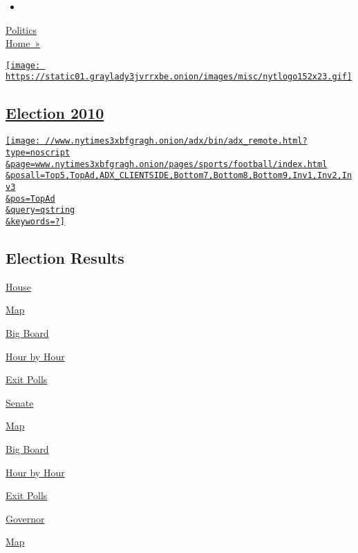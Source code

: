 \begin{itemize}
\item
\end{itemize}

\href{//politics.nytimes3xbfgragh.onion}{Politics\\
Home~»}

\href{//www.nytimes3xbfgragh.onion}{\texttt{[image: https://static01.graylady3jvrrxbe.onion/images/misc/nytlogo152x23.gif]}}

\hypertarget{election-2010}{%
\subsection{\texorpdfstring{\href{../results/senate.html}{Election
2010}}{Election 2010}}\label{election-2010}}

\href{//www.nytimes3xbfgragh.onion/adx/bin/adx_click.html?type=cookie\&pos=TopAd}{\texttt{[image: //www.nytimes3xbfgragh.onion/adx/bin/adx\_remote.html?type=noscript\\\&page=www.nytimes3xbfgragh.onion/pages/sports/football/index.html\\\&posall=Top5,TopAd,ADX\_CLIENTSIDE,Bottom7,Bottom8,Bottom9,Inv1,Inv2,Inv3\\\&pos=TopAd\\\&query=qstring\\\&keywords=?]}}

\href{../results/senate.html}{}

\hypertarget{election-results}{%
\subsection{Election Results}\label{election-results}}

\href{house.html}{House}

\href{house.html}{Map}

\href{/elections/2010/results/house/big-board.html}{Big Board}

\href{/elections/2010/results/house/preview.html}{Hour by Hour}

\href{/elections/2010/results/house/exit-polls.html}{Exit Polls}

\href{senate.html}{Senate}

\href{senate.html}{Map}

\href{/elections/2010/results/senate/big-board.html}{Big Board}

\href{/elections/2010/results/senate/preview.html}{Hour by Hour}

\href{/elections/2010/results/senate/exit-polls.html}{Exit Polls}

\href{governor.html}{Governor}

\href{governor.html}{Map}

